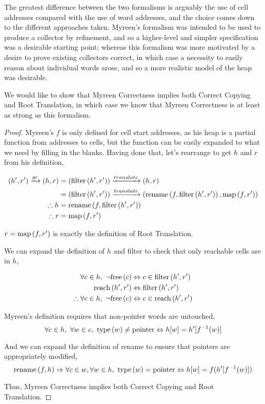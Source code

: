 The greatest difference between the two formalisms is arguably the use
of cell addresses compared with the use of word addresses, and the
choice comes down to the different approaches taken. Myreen's
formalism was intended to be used to produce a collector by
refinement, and so a higher-level and simpler specification was a
desirable starting point; whereas this formalism was more motivated by
a desire to prove existing collectors correct, in which case a
necessity to easily reason about individual words arose, and so a more
realistic model of the heap was desirable.

\begin{theorem}
  We would like to show that Myreen Correctness implies both Correct
  Copying and Root Translation, in which case we know that Myreen
  Correctness is at least as strong as this formalism.
\end{theorem}

\begin{proof}
    Myreen's $f$ is only defined for cell start addresses, as his heap
    is a partial function from addresses to cells, but the function
    can be easily expanded to what we need by filling in the
    blanks. Having done that, let's rearrange to get $h$ and $r$ from
    his definition,

    \begin{align*}
      (h', r') \xrightarrow{gc} (h, r) &= (\mathrm{filter}\left(h', r'\right)) \xrightarrow{translate} (h, r)\\
      &= (\mathrm{filter}\left(h', r'\right)) \xrightarrow{translate} (\mathrm{rename}\left(f, \mathrm{filter}\left(h', r'\right)\right), \mathrm{map}\left(f, r'\right))\\
      \therefore h &= \mathrm{rename}\left(f, \mathrm{filter}\left(h', r'\right)\right)\\
      \therefore r &= \mathrm{map}\left(f, r'\right)
    \end{align*}

    $r = \mathrm{map}\left(f, r'\right)$ is exactly the definition of Root Translation.

    We can expand the definition of $h$ and filter to check that only
    reachable cells are in $h$,

    \begin{align*}
      \forall c \in h,\ \lnot\mathrm{free}\left(c\right) &\Leftrightarrow c \in \mathrm{filter}\left(h', r'\right)\\
      \mathrm{reach}\left(h', r'\right) &\Leftrightarrow \mathrm{filter}\left(h', r'\right)\\
      \therefore \forall c \in h,\ \lnot\mathrm{free}\left(c\right) &\Leftrightarrow c \in \mathrm{reach}\left(h', r'\right)
    \end{align*}

    Myreen's definition requires that non-pointer words are
    untouched, \[\forall c \in h,\ \forall w \in c,\ \type{w}
    \neq \typointer \iff h[w] = h'[f^{-1}(w)]\]

    And we can expand the definition of rename to ensure that pointers
    are appropriately modified, \[\mathrm{rename}\left(f, h\right) \Rightarrow \forall c \in
    w, \forall w \in h,\ \mathrm{type}\left(w\right) = \mathrm{pointer} \Leftrightarrow h[w]
    = f(h'[f^{-1}(w)])\]

    Thus, Myreen Correctness implies both Correct Copying and Root
    Translation.
\end{proof}

